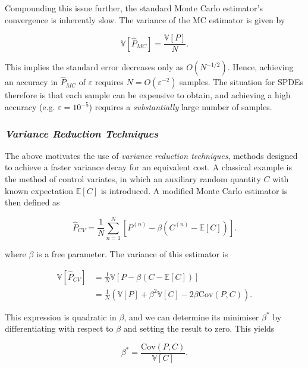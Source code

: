Compounding this issue further, the standard Monte Carlo estimator's convergence is 
inherently slow. The variance of the MC estimator is given by 

\begin{equation*}
    \mathbb{V}[\hat{P}_{MC}] = \frac{\mathbb{V}[P]}{N}.
\end{equation*}

This implies the standard error decreases only as $O(N^{-1/2})$. Hence, 
achieving an accuracy in $\hat{P}_{MC}$ of $\varepsilon$ requires 
$N = O(\varepsilon^{-2})$ samples. The situation for SPDEs therefore is that 
each sample can be expensive to obtain, and achieving a high accuracy (e.g. 
$\varepsilon = 10^{-5}$) requires a \textit{substantially} large number of samples.

\subsubsection*{\textit{Variance Reduction Techniques}}

The above motivates the use of \textit{variance reduction techniques}, methods 
designed to achieve a faster variance decay for an equivalent cost. A classical 
example is the method of control variates, in which an auxiliary random 
quantity $C$ with known expectation $\mathbb{E}[C]$ is introduced. A modified 
Monte Carlo estimator is then defined as

\begin{equation*}
    \hat{P}_{CV} = \frac{1}{N}\sum_{n=1}^{N}\left[P^{(n)} - \beta(C^{(n)} - \mathbb{E}[C])\right].
\end{equation*}

where $\beta$ is a free parameter. The variance of this estimator is 

\begin{align*}
    \mathbb{V}[\hat{P}_{CV}] &= \frac{1}{N}\mathbb{V}[P - \beta(C-\mathbb{E}[C])] \\
     &= \frac{1}{N}\left(\mathbb{V}[P] + \beta^2\mathbb{V}[C] - 2\beta\mathrm{Cov}(P,C)\right).
\end{align*}

This expression is quadratic in $\beta$, and we can determine its minimiser 
$\beta^*$ by differentiating with respect to $\beta$ and setting the result to zero. 
This yields

\begin{equation*}
    \beta^* = \frac{\mathrm{Cov}(P, C)}{\mathbb{V}[C]}.
\end{equation*}

